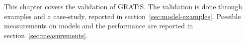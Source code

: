 This chapter covers the validation of GRATiS. The validation is done through examples and a case-study, reported in section~\ref{sec:model-examples}. Possible measurements on models and the performance are reported in section~\ref{sec:measurements}.

